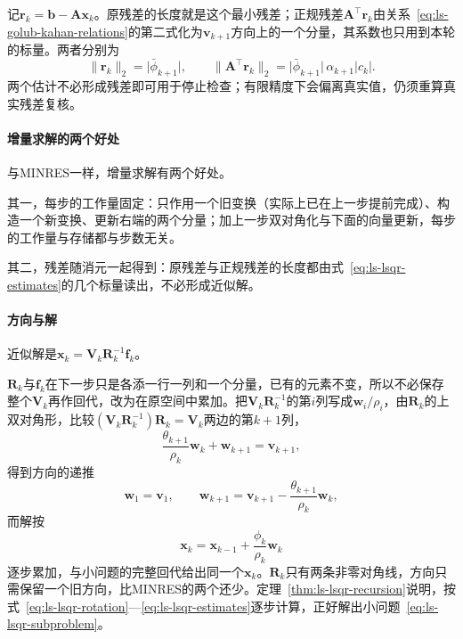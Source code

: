 记$\bm r_k=\bm b-\bm A\bm x_k$。原残差的长度就是这个最小残差；正规残差$\bm A^\top\bm r_k$由关系~\eqref{eq:ls-golub-kahan-relations}的第二式化为$\bm v_{k+1}$方向上的一个分量，其系数也只用到本轮的标量。两者分别为
\begin{equation}
 \lVert\bm r_k\rVert_2=\lvert\bar\phi_{k+1}\rvert,\qquad
 \lVert\bm A^\top\bm r_k\rVert_2=\lvert\bar\phi_{k+1}\rvert\,\alpha_{k+1}\lvert c_k\rvert .
 \label{eq:ls-lsqr-estimates}
\end{equation}
两个估计不必形成残差即可用于停止检查；有限精度下会偏离真实值，仍须重算真实残差复核。

\paragraph{增量求解的两个好处}
与MINRES一样，增量求解有两个好处。

其一，每步的工作量固定：只作用一个旧变换（实际上已在上一步提前完成）、构造一个新变换、更新右端的两个分量；加上一步双对角化与下面的向量更新，每步的工作量与存储都与步数无关。

其二，残差随消元一起得到：原残差与正规残差的长度都由式~\eqref{eq:ls-lsqr-estimates}的几个标量读出，不必形成近似解。

\paragraph{方向与解}
近似解是$\bm x_k=\bm V_k\bm R_k^{-1}\bm f_k$。

$\bm R_k$与$\bm f_k$在下一步只是各添一行一列和一个分量，已有的元素不变，所以不必保存整个$\bm V_k$再作回代，改为在原空间中累加。把$\bm V_k\bm R_k^{-1}$的第$i$列写成$\bm w_i/\rho_i$，由$\bm R_k$的上双对角形，比较$(\bm V_k\bm R_k^{-1})\bm R_k=\bm V_k$两边的第$k+1$列，
\[
 \frac{\theta_{k+1}}{\rho_k}\bm w_k+\bm w_{k+1}=\bm v_{k+1},
\]
得到方向的递推
\begin{equation}
 \bm w_1=\bm v_1,\qquad \bm w_{k+1}=\bm v_{k+1}-\frac{\theta_{k+1}}{\rho_k}\bm w_k ,
 \label{eq:ls-lsqr-direction}
\end{equation}
而解按
\begin{equation}
 \bm x_k=\bm x_{k-1}+\frac{\phi_k}{\rho_k}\bm w_k
 \label{eq:ls-lsqr-update}
\end{equation}
逐步累加，与小问题的完整回代给出同一个$\bm x_k$。$\bm R_k$只有两条非零对角线，方向只需保留一个旧方向，比MINRES的两个还少。定理~\ref{thm:ls-lsqr-recursion}说明，按式~\eqref{eq:ls-lsqr-rotation}—\eqref{eq:ls-lsqr-estimates}逐步计算，正好解出小问题~\eqref{eq:ls-lsqr-subproblem}。

